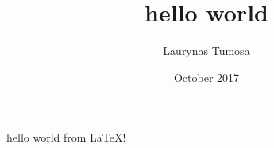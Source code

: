 \documentclass{article}
\title{hello world}
\author{Laurynas Tumosa }
\date{October 2017}
\begin{document}
\maketitle
hello world from \LaTeX !
\end{document}
